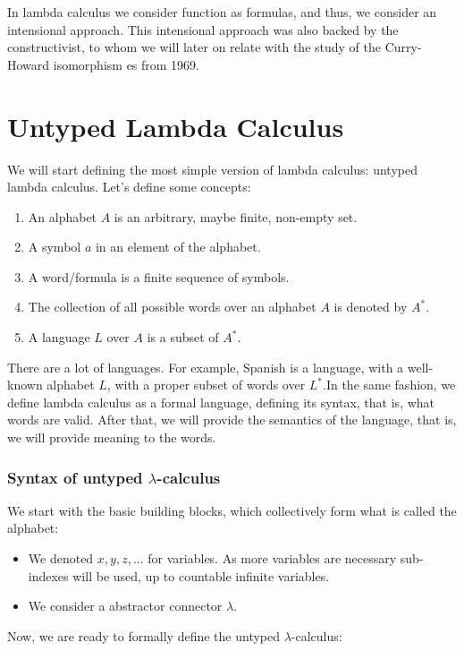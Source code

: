 In lambda calculus we consider function as formulas, and thus, we consider an intensional approach. This intensional approach was also backed by the constructivist, to whom we will later on relate with the study of the Curry-Howard isomorphism  \cite{howard1980formulae} es from 1969.\\


\section{Untyped Lambda Calculus }
We will start defining the most simple version of lambda calculus: untyped lambda calculus. Let's define some concepts:


\begin{enumerate}
\item An alphabet $A$ is an arbitrary, maybe finite, non-empty set.
\item A symbol $a$ in an element of the alphabet.
\item A word/formula is a finite sequence of symbols.
\item The collection of all possible words over an alphabet $A$ is denoted by $A^*$.
\item A language $L$ over $A$  is a subset of $A^*.$
\end{enumerate}

There are a lot of languages. For example, Spanish is a language, with a well-known alphabet $L$, with a proper subset of words over $L^*$.In the same fashion, we define lambda calculus as a formal language, defining its syntax, that is, what words are valid. After that, we will provide the semantics of the language, that is, we will provide meaning to the words.\\


\subsubsection{Syntax of untyped $\lambda$-calculus}
We start with the basic building blocks, which collectively form what is
called the alphabet:

\begin{itemize}
\item We denoted $x, y, z,...$ for variables. As more variables are necessary sub-indexes will be used, up to countable infinite variables.
\item We consider a abstractor connector $\lambda$.
\end{itemize}
Now, we are ready to formally define the untyped $\lambda$-calculus:

